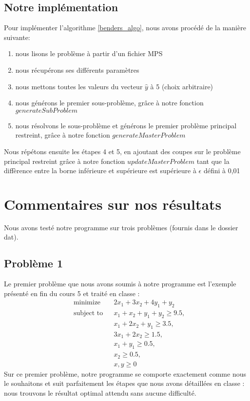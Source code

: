 \documentclass[a4paper]{article}
\begin{document}
\subsection{Notre implémentation}
Pour implémenter l'algorithme \ref{benders_algo}, nous avons procédé de la manière suivante:
\begin{enumerate}[nolistsep]
\item nous lisons le problème à partir d'un fichier MPS
\item nous récupérons ses différents paramètres
\item nous mettons toutes les valeurs du vecteur $\hat{y}$ à 5 (choix arbitraire)
\item nous générons le premier sous-problème, grâce à notre fonction $generateSubProblem$
\item nous résolvons le sous-problème et générons le premier problème principal restreint, grâce à notre fonction $generateMasterProblem$
\end{enumerate}
Nous répétons ensuite les étapes 4 et 5, en ajoutant des coupes sur le problème principal restreint grâce à notre fonction $updateMasterProblem$ tant que la diffèrence entre la borne inférieure et supérieure est supérieure à $\epsilon$ défini à 0,01

\section{Commentaires sur nos résultats}
Nous avons testé notre programme sur trois problèmes (fournis dans le dossier dat).
\subsection{Problème 1}
Le premier problème que nous avons soumis à notre programme est l'exemple présenté en fin du cours 5 et traité en classe :
\begin{equation}
\begin{aligned}
& {\text{minimize}}
& & 2x_{1} + 3x_{2} + 4y_{1} + y_{2} \\
& \text{subject to}
& & x_{1} + x_{2} + y_{1} + y_{2} \geq 9.5, \\
& & & x_{1} + 2x_{2} + y_{1} \geq 3.5, \\
& & & 3x_{1} + 2x_{2} \geq 1.5, \\
& & & x_{1} + y_{1} \geq 0.5, \\
& & & x_{2} \geq 0.5, \\
& & & x, y \geq 0
\end{aligned}
\label{Pb1}
\end{equation}
Sur ce premier problème, notre programme se comporte exactement comme nous le souhaitons et suit parfaitement les étapes que nous avons détaillées en classe : nous trouvons le résultat optimal attendu sans aucune difficulté.
\end{document}
